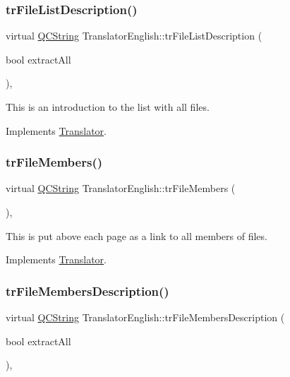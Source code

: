 \subsubsection{\texorpdfstring{trFileListDescription()}{trFileListDescription()}}
{\footnotesize\ttfamily virtual \mbox{\hyperlink{class_q_c_string}{Q\+C\+String}} Translator\+English\+::tr\+File\+List\+Description (\begin{DoxyParamCaption}\item[{bool}]{extract\+All }\end{DoxyParamCaption})\hspace{0.3cm}{\ttfamily [inline]}, {\ttfamily [virtual]}}

This is an introduction to the list with all files. 

Implements \mbox{\hyperlink{class_translator}{Translator}}.

\mbox{\label{class_translator_english_a187906f179f43391a1927e30030e9fd7}} 
\subsubsection{\texorpdfstring{trFileMembers()}{trFileMembers()}}
{\footnotesize\ttfamily virtual \mbox{\hyperlink{class_q_c_string}{Q\+C\+String}} Translator\+English\+::tr\+File\+Members (\begin{DoxyParamCaption}{ }\end{DoxyParamCaption})\hspace{0.3cm}{\ttfamily [inline]}, {\ttfamily [virtual]}}

This is put above each page as a link to all members of files. 

Implements \mbox{\hyperlink{class_translator}{Translator}}.

\mbox{\label{class_translator_english_addf6c991afdd7f3505efc1b54ee2abb9}} 
\subsubsection{\texorpdfstring{trFileMembersDescription()}{trFileMembersDescription()}}
{\footnotesize\ttfamily virtual \mbox{\hyperlink{class_q_c_string}{Q\+C\+String}} Translator\+English\+::tr\+File\+Members\+Description (\begin{DoxyParamCaption}\item[{bool}]{extract\+All }\end{DoxyParamCaption})\hspace{0.3cm}{\ttfamily [inline]}, {\ttfamily [virtual]}}

